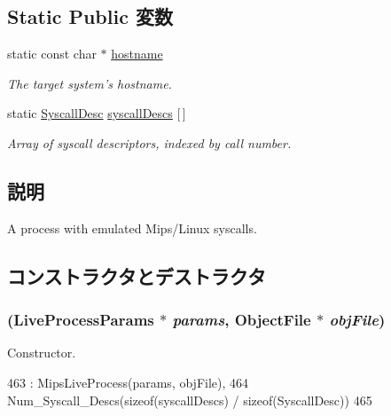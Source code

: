 \subsection*{Static Public 変数}
\begin{DoxyCompactItemize}
\item 
static const char $\ast$ \hyperlink{classMipsLinuxProcess_aad01339e89106fdf68f57ef118956fa9}{hostname}
\begin{DoxyCompactList}\small\item\em The target system's hostname. \item\end{DoxyCompactList}\item 
static \hyperlink{classSyscallDesc}{SyscallDesc} \hyperlink{classMipsLinuxProcess_a08d67a94820b75842e07f030e548372e}{syscallDescs} \mbox{[}$\,$\mbox{]}
\begin{DoxyCompactList}\small\item\em Array of syscall descriptors, indexed by call number. \item\end{DoxyCompactList}\end{DoxyCompactItemize}


\subsection{説明}
A process with emulated Mips/Linux syscalls. 

\subsection{コンストラクタとデストラクタ}
\hypertarget{classMipsLinuxProcess_a34d6e691166d7f1b7d336afba7b5d54f}{
\subsubsection[{MipsLinuxProcess}]{ (LiveProcessParams $\ast$ {\em params}, \/  {\bf ObjectFile} $\ast$ {\em objFile})}}
\label{classMipsLinuxProcess_a34d6e691166d7f1b7d336afba7b5d54f}


Constructor. 


\begin{DoxyCode}
463     : MipsLiveProcess(params, objFile),
464      Num_Syscall_Descs(sizeof(syscallDescs) / sizeof(SyscallDesc))
465 {  }
\end{DoxyCode}


